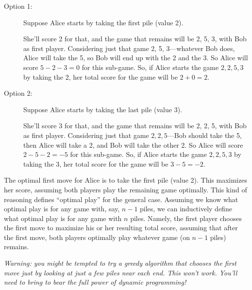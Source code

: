 \documentclass[11pt]{article}
\begin{document}
\begin{description}
\item[Option 1:]
  Suppose Alice starts by taking the first pile (value 2).

  She'll score 2 for that, and the game that remains will be 2, 5, 3, with Bob as first player.
  Considering just that game 2, 5, 3---whatever Bob does, Alice will take the 5, so Bob will end up with the 2 and the 3.  So Alice will score $5-2-3 = 0$ for this sub-game.
  So, if Alice starts the game $2, 2, 5, 3$ by taking the 2, her total score for the game will be $2 + 0 = 2$.
 
\item[Option 2:]
  Suppose Alice starts by taking the last pile (value 3).

  She'll score 3 for that, and the game that remains will be 2, 2, 5, with Bob as first player.
  Considering just that game $2, 2, 5$---Bob should take the 5, then Alice will take a 2, and Bob will take the other 2.  So Alice will score $2-5-2 = -5$ for this sub-game.
  So, if Alice starts the game $2, 2, 5, 3$ by taking the 3, her total score for the game will be $3 - 5 = -2$.
\end{description}

The optimal first move for Alice is to take the first pile (value 2).  This maximizes her score, assuming both players play the remaining game optimally.
This kind of reasoning defines ``optimal play'' for the general case.   Assuming we know what optimal play is for any game with, say, $n-1$ piles, we can inductively define what optimal play is for any game with $n$ piles.  Namely, the first player chooses the first move to maximize his or her resulting total score, assuming that after the first move, both players optimally play whatever game (on $n-1$ piles) remains.
 

\emph{Warning: you might be tempted to try a greedy algorithm that chooses the first move just by looking at just a few piles near each end.  This won't work.  You'll need to bring to bear the full power of dynamic programming!}


\normalsize
\end{document}
